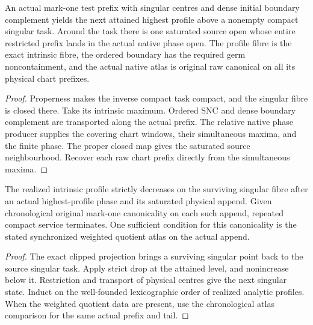 \begin{theorem}
\label{hir:g8-actual-highest-profile-restart}
\leanok
An actual mark-one test prefix with singular centres and dense initial
boundary complement yields the next attained highest profile above a
nonempty compact singular task. Around the task there is one saturated
source open whose entire restricted prefix lands in the actual native
phase open. The profile fibre is the exact intrinsic fibre, the
ordered boundary has the required germ noncontainment, and the actual
native atlas is original raw canonical on all its physical chart
prefixes.
\end{theorem}
\begin{proof}
Properness makes the inverse compact task compact, and the singular
fibre is closed there. Take its intrinsic maximum. Ordered SNC and
dense boundary complement are transported along the actual prefix.
The relative native phase producer supplies the covering chart
windows, their simultaneous maxima, and the finite phase. The
proper closed map gives the saturated source neighbourhood. Recover
each raw chart prefix directly from the simultaneous maxima.
\end{proof}

\begin{theorem}
\label{hir:g8-actual-clipped-serving-rank}
\leanok
The realized intrinsic profile strictly decreases on the surviving
singular fibre after an actual highest-profile phase and its saturated
physical append. Given chronological original mark-one canonicality
on each such append, repeated compact service terminates. One
sufficient condition for this canonicality is the stated synchronized
weighted quotient atlas on the actual append.
\end{theorem}
\begin{proof}
The exact clipped projection brings a surviving singular point back
to the source singular task. Apply strict drop at the attained level,
and nonincrease below it. Restriction and transport of physical
centres give the next singular state. Induct on the well-founded
lexicographic order of realized analytic profiles. When the weighted
quotient data are present, use the chronological atlas comparison
for the same actual prefix and tail.
\end{proof}


